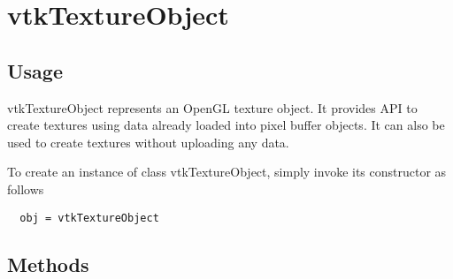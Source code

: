 \section{vtkTextureObject}

\subsection{Usage}

 vtkTextureObject represents an OpenGL texture object. It provides API to
 create textures using data already loaded into pixel buffer objects. It can
 also be used to create textures without uploading any data.

To create an instance of class vtkTextureObject, simply
invoke its constructor as follows
\begin{verbatim}
  obj = vtkTextureObject
\end{verbatim}
\subsection{Methods}

